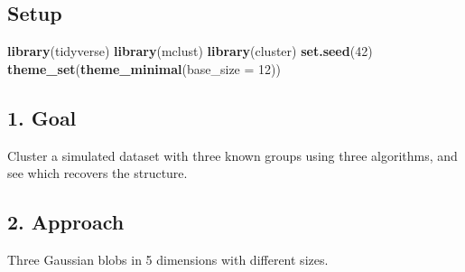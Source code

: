 \documentclass[
]{article}
\newenvironment{Shaded}{\begin{snugshade}}{\end{snugshade}}
\newcommand{\AttributeTok}[1]{\textcolor[rgb]{0.13,0.29,0.53}{#1}}
\newcommand{\DecValTok}[1]{\textcolor[rgb]{0.00,0.00,0.81}{#1}}
\newcommand{\FunctionTok}[1]{\textcolor[rgb]{0.13,0.29,0.53}{\textbf{#1}}}
\newcommand{\NormalTok}[1]{#1}
\begin{document}
\subsection{Setup}\label{setup}

\begin{Shaded}
\begin{Highlighting}[]
\FunctionTok{library}\NormalTok{(tidyverse)}
\FunctionTok{library}\NormalTok{(mclust)}
\FunctionTok{library}\NormalTok{(cluster)}
\FunctionTok{set.seed}\NormalTok{(}\DecValTok{42}\NormalTok{)}
\FunctionTok{theme\_set}\NormalTok{(}\FunctionTok{theme\_minimal}\NormalTok{(}\AttributeTok{base\_size =} \DecValTok{12}\NormalTok{))}
\end{Highlighting}
\end{Shaded}

\subsection{1. Goal}\label{goal}

Cluster a simulated dataset with three known groups using three
algorithms, and see which recovers the structure.

\subsection{2. Approach}\label{approach}

Three Gaussian blobs in 5 dimensions with different sizes.
\end{document}
